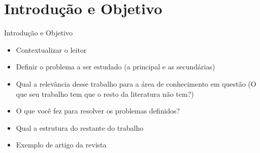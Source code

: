 \section{Introdução e Objetivo}

\begin{frame}	
	\begin{block}{Introdução e Objetivo}
		 \begin{itemize}
			  \item Contextualizar o leitor			
			  \item Definir o problema a ser estudado (a principal e as secundárias)
			  \item Qual a relevância desse trabalho para a área de conhecimento em questão (O que seu trabalho tem que o resto da literatura não tem?)
			  \item O que você fez para resolver os problemas definidos?
			  \item Qual a estrutura do restante do trabalho
			  \item Exemplo de artigo da revista \href{https://www.nature.com/scitable/topicpage/scientific-papers-13815490}{\color{blue}{Nature}} 
		  \end{itemize}
	\end{block}
\end{frame}
